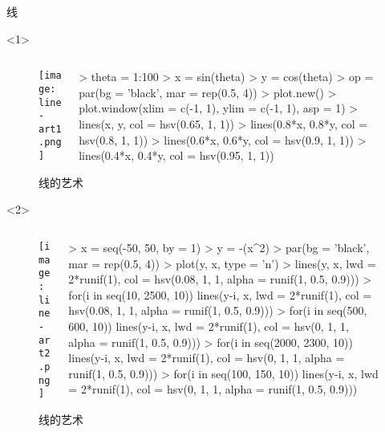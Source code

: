 \begin{frame}[c,fragile]{\subsecname}{线}
\begin{onlyenv}<1>
\begin{figure}
  \begin{columns}
    \begin{column}[c]{.4\textwidth}
        \texttt{[image: line-art1.png]}
    \end{column}

    \begin{column}[c]{.6\textwidth}
\begin{rcode}
> theta = 1:100
> x = sin(theta)
> y = cos(theta)
> op = par(bg = 'black', mar = rep(0.5, 4))
> plot.new()
> plot.window(xlim = c(-1, 1), ylim = c(-1, 1), asp = 1)
> lines(x, y, col = hsv(0.65, 1, 1))
> lines(0.8*x, 0.8*y, col = hsv(0.8, 1, 1))
> lines(0.6*x, 0.6*y, col = hsv(0.9, 1, 1))
> lines(0.4*x, 0.4*y, col = hsv(0.95, 1, 1))
\end{rcode}
    \end{column}
  \end{columns}
  \caption{线的艺术}
\end{figure}
\end{onlyenv} 

\begin{onlyenv}<2>
\begin{figure}
  \begin{columns}
    \begin{column}[c]{.4\textwidth}
        \texttt{[image: line-art2.png]}
    \end{column}

    \begin{column}[c]{.6\textwidth}
\begin{rcode}
> x = seq(-50, 50, by = 1)
> y = -(x^2)
> par(bg = 'black', mar = rep(0.5, 4))
> plot(y, x, type = 'n')
> lines(y, x, lwd = 2*runif(1), col = hsv(0.08, 1, 1, alpha = runif(1, 0.5, 0.9)))
> for(i in seq(10, 2500, 10)){
      lines(y-i, x, lwd = 2*runif(1), col = hsv(0.08, 1, 1, alpha = runif(1, 0.5, 0.9)))
  }
> for(i in seq(500, 600, 10)){
      lines(y-i, x, lwd = 2*runif(1), col = hsv(0, 1, 1, alpha = runif(1, 0.5, 0.9)))
  }
> for(i in seq(2000, 2300, 10)){
      lines(y-i, x, lwd = 2*runif(1), col = hsv(0, 1, 1, alpha = runif(1, 0.5, 0.9)))
  }
> for(i in seq(100, 150, 10)){
      lines(y-i, x, lwd = 2*runif(1), col = hsv(0, 1, 1, alpha = runif(1, 0.5, 0.9)))
  }
\end{rcode}
    \end{column}
  \end{columns}
  \caption{线的艺术}
\end{figure}
\end{onlyenv} 


\end{frame}
